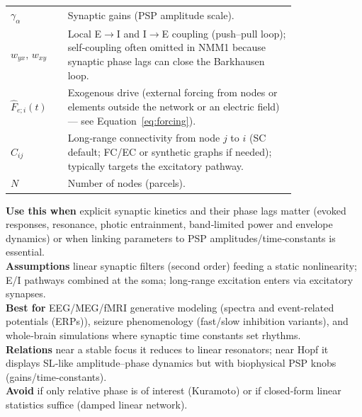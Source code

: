 \documentclass[11pt]{article}
\numberwithin{equation}{section}
\begin{document}
\begin{tcolorbox}
\begin{tabular}{@{}l p{0.8\linewidth}@{}}
\textbf{$\gamma_{\alpha}$} & Synaptic gains (PSP amplitude scale).\\
\textbf{$w_{yx},\,w_{xy}$} & Local E$\!\to$I and I$\!\to$E coupling (push–pull loop); self‑coupling often omitted in NMM1 because synaptic phase lags can close the Barkhausen loop.\\
\textbf{$\hat F_{e;i}(t)$}& Exogenous drive  (external forcing from nodes or elements outside the network or an electric field)--- see Equation~\ref{eq:forcing}).\\
\textbf{$C_{ij}$} & Long‑range connectivity from node $j$ to $i$ (SC default; FC/EC or synthetic graphs if needed); typically targets the excitatory pathway.\\
\textbf{$N$} & Number of nodes (parcels).\\
\end{tabular}
\end{tcolorbox}

\begin{tcolorbox}[
  colback=gray!5,
  colframe=slate,
  colbacktitle=softblue!25,
  coltitle=softblue!60!black,
  fonttitle=\bfseries\small,
  title={\small When to Use It},
  boxrule=0.4pt, enhanced, sharp corners,
  left=4pt,right=4pt,top=3pt,bottom=3pt,
  boxsep=2pt, before skip=6pt, after skip=6pt
]
\scriptsize
\textbf{Use this when} explicit synaptic kinetics and their phase lags matter (evoked responses, resonance, photic entrainment, band‑limited power and envelope dynamics) or when linking parameters to PSP amplitudes/time‑constants is essential.\\
\textbf{Assumptions} linear synaptic filters (second order) feeding a static nonlinearity; E/I pathways combined at the soma; long‑range excitation enters via excitatory synapses.\\
\textbf{Best for} EEG/MEG/fMRI generative modeling (spectra and event-related potentials (ERPs)), seizure phenomenology (fast/slow inhibition variants), and whole‑brain simulations where synaptic time constants set rhythms.\\
\textbf{Relations} near a stable focus it reduces to linear resonators; near Hopf it displays SL‑like amplitude–phase dynamics but with biophysical PSP knobs (gains/time‑constants).\\
\textbf{Avoid} if only relative phase is of interest (Kuramoto) or if closed‑form linear statistics suffice (damped linear network).
\end{tcolorbox}
\end{document}
